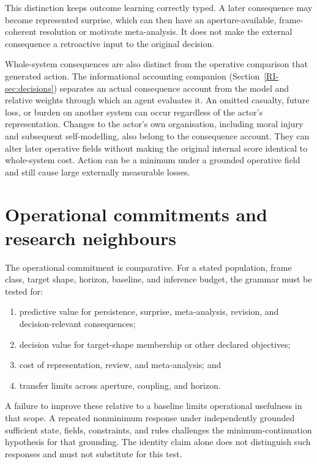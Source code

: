 \documentclass[11pt,a4paper]{article}
\theoremstyle{remark}
\begin{document}
This distinction keeps outcome learning correctly typed. A later consequence may
become represented surprise, which can then have an aperture-available,
frame-coherent resolution or motivate meta-analysis. It does not make the
external consequence a retroactive input to the original decision.

Whole-system consequences are also distinct from the operative comparison
that generated action. The informational accounting companion
(Section~\ref{RI-sec:decisions}) separates an actual consequence account from
the model and relative weights through which an agent evaluates it.
An omitted casualty, future loss, or burden on another system can occur
regardless of the actor's representation. Changes to the actor's own
organisation, including moral injury and subsequent self-modelling, also
belong to the consequence account. They can alter later operative fields
without making the original internal score identical to whole-system cost.
Action can be a minimum under a grounded operative field and still cause
large externally measurable losses.

\section{Operational commitments and research neighbours}\label{sec:operational}

The operational commitment is comparative. For a stated population, frame
class, target shape, horizon, baseline, and inference budget, the grammar must
be tested for:
\begin{enumerate}[label=(\arabic*)]
\item predictive value for persistence, surprise, meta-analysis, revision, and
      decision-relevant consequences;
\item decision value for target-shape membership or other declared objectives;
\item cost of representation, review, and meta-analysis; and
\item transfer limits across aperture, coupling, and horizon.
\end{enumerate}
A failure to improve these relative to a baseline limits operational
usefulness in that scope. A repeated nonminimum response under independently
grounded sufficient state, fields, constraints, and rules challenges the
minimum-continuation hypothesis for that grounding. The identity claim alone
does not distinguish such responses and must not substitute for this test.
\end{document}
